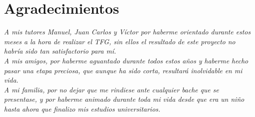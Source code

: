 \pagestyle{plain}
\chapter*{Agradecimientos}

{\it 
A mis tutores Manuel, Juan Carlos y Víctor por haberme orientado durante estos meses a la hora de realizar el TFG, sin ellos el resultado de este proyecto no habría sido tan satisfactorio para mí.
\\

A mis amigos, por haberme aguantado durante todos estos años y haberme hecho pasar una etapa preciosa, que aunque ha sido corta, resultará inolvidable en mi vida.
\\

A mi familia, por no dejar que me rindiese ante cualquier bache que se presentase, y por haberme animado durante toda mi vida desde que era un niño hasta ahora que finalizo mis estudios universitarios.
}